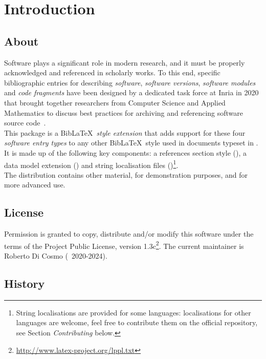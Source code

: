 \documentclass{ltxdockit}
\begin{document}
\printtitlepage
\tableofcontents

\section{Introduction}\label{sec:intro}

\subsection{About}

Software plays a significant role in modern research, and it must be properly
acknowledged and referenced in scholarly works. To this end, specific
bibliographic entries for describing \emph{software}, \emph{software versions},
\emph{software modules} and \emph{code fragments} have been designed by a
dedicated task force at Inria in 2020 that brought together researchers from
Computer Science and Applied Mathematics to discuss best practices for archiving
and referencing software source code~\cite{2020GtCitation}.\\

This package is a Bib\LaTeX\ \emph{style extension} that adds support for these
four \emph{software entry types} to any other Bib\LaTeX\ style used in documents
typeset in \latex. It is made up of the following key components: a references
section style (), a data model extension
() and string localisation files
()\footnote{String localisations are provided for
  some languages: localisations for other languages are welcome, feel free to
  contribute them on the official repository, see Section \emph{Contributing} below.}.\\

The distribution contains other material, for demonstration purposes, and for
more advanced use.

\subsection{License}

Permission is granted to copy, distribute and/or modify this software under
the terms of the \latex Project Public License, version
1.3c\footnote{\url{http://www.latex-project.org/lppl.txt}}. The current
maintainer is Roberto Di Cosmo (\textcopyright\ 2020-2024).

\subsection{History}
\end{document}
